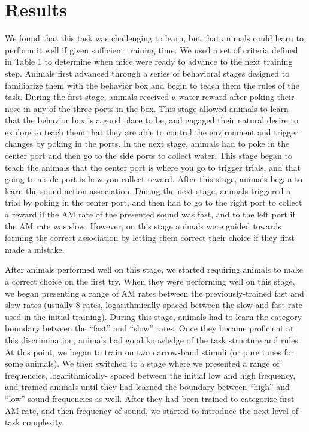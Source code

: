 \section{Results}

We found that this task was challenging to learn, but that animals could learn
to perform it well if given sufficient training time.
%
We used a set of criteria defined in Table 1 to determine when mice were ready
to advance to the next training step.
%
Animals first advanced through a series of behavioral stages designed to
familiarize them with the behavior box and begin to teach them the rules of the
task.
%
During the first stage, animals received a water reward after poking their nose
in any of the three ports in the box.
%
This stage allowed animals to learn that the behavior box is a good place to
be, and engaged their natural desire to explore to teach them that they are
able to control the environment and trigger changes by poking in the ports.
%
In the next stage, animals had to poke in the center port and then go to the
side ports to collect water.
%
This stage began to teach the animals that the center port is where you go to
trigger trials, and that going to a side port is how you collect reward.
%
After this stage, animals began to learn the sound-action association.
%
During the next stage, animals triggered a trial by poking in the center port,
and then had to go to the right port to collect a reward if the AM rate of the
presented sound was fast, and to the left port if the AM rate was slow.
%
However, on this stage animals were guided towards forming the correct
association by letting them correct their choice if they first made a mistake.
%

After animals performed well on this stage, we started requiring animals to
make a correct choice on the first try.
%
When they were performing well on this stage, we began presenting a range of AM
rates between the previously-trained fast and slow rates (usually 8 rates,
logarithmically-spaced between the slow and fast rate used in the initial training).
%
During this stage, animals had to learn the category boundary between the
``fast'' and ``slow'' rates.
%
Once they became proficient at this discrimination, animals had good knowledge
of the task structure and rules.
%
At this point, we began to train on two narrow-band stimuli (or pure tones for
some animals).
%
We then switched to a stage where we presented a range of frequencies, logarithmically-
spaced between the initial low and high frequency, and
trained animals until they had learned the boundary between ``high'' and
``low'' sound frequencies as well.
%
After they had been trained to categorize first AM rate, and then frequency of sound,
we started to introduce the next level of task complexity.

